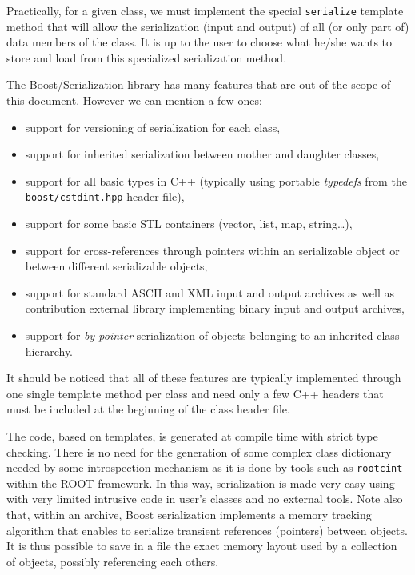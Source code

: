\documentclass[a4paper,12pt]{article}
\newcommand{\pn}{\par\noindent}
\begin{document}
Practically,  for a given  class, we  must  implement  the  special
\texttt{serialize} template  method that will  allow the serialization
(input  and output)  of all  (or  only part  of) data  members of  the
class. It is up to the user  to choose what he/she wants to store and
load from this specialized serialization method.

The Boost/Serialization library has many  features that are out of the
scope of this document. However we can mention a few ones:
\begin{itemize}

\item support for versioning of serialization for each class,

\item support for inherited  serialization between mother and daughter
  classes,

\item support for  all basic types in C++  (typically using portable
  \emph{typedefs} from the \texttt{boost/cstdint.hpp} header file),

\item support for some basic STL containers (vector, list, map, string\dots),

\item  support   for  cross-references  through   pointers  within  an
  serializable object or between different serializable objects,

\item support  for standard  ASCII and XML  input and  output archives
  as well as contribution external library  implementing binary input
  and output archives,

\item support for \emph{by-pointer} serialization of objects belonging to
  an inherited class hierarchy.

\end{itemize}

\pn  It should be  noticed that  all of  these features  are typically
implemented through one single template method per class and need only
a few C++ headers that must  be included at the beginning of the class
header file.

\pn The  code, based on templates,  is generated at  compile time with
strict  type checking. There  is no  need for  the generation  of some
complex class dictionary needed  by some introspection mechanism as it
is  done   by  tools  such   as  \texttt{rootcint}  within   the  ROOT
framework. In  this way,  serialization is made  very easy  using with
very limited intrusive  code in user's classes and  no external tools.
Note also  that, within an  archive, Boost serialization  implements a
memory  tracking   algorithm  that  enables   to  serialize  transient
references (pointers) between objects. It is thus possible to save in a file
the exact memory layout used by a collection of objects, possibly referencing
each others.
\end{document}
